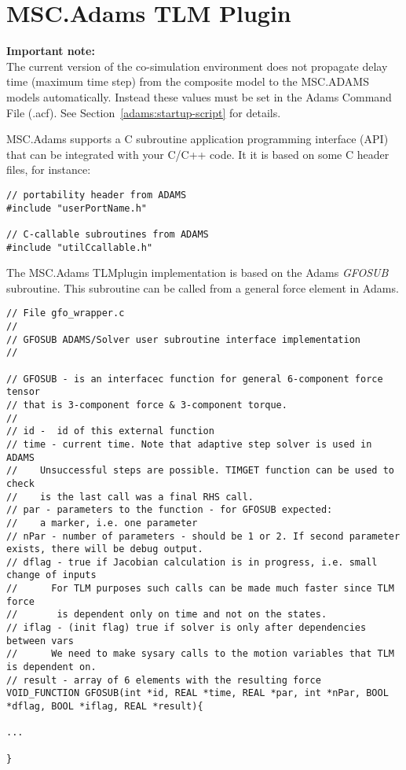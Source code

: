 \chapter{MSC.Adams TLM Plugin}

{\bf Important note:}\\ The current version of the co-simulation environment does not propagate delay time (maximum time step) from the composite model to the MSC.ADAMS models automatically. 
Instead these values must be set in the Adams Command File (.acf). 
See Section~\ref{adams:startup-script} for details.


MSC.Adams supports a C subroutine application programming interface (API) that can be integrated with your C/C++ code. 
It it is based on some C header files, for instance:

{
\scriptsize
\begin{verbatim}
// portability header from ADAMS
#include "userPortName.h"

// C-callable subroutines from ADAMS
#include "utilCcallable.h"
\end{verbatim}
}


The MSC.Adams TLMplugin implementation is based on the Adams {\em GFOSUB} subroutine. 
This subroutine can be called from a general force element in Adams.

{
\scriptsize
\begin{verbatim}
// File gfo_wrapper.c
//
// GFOSUB ADAMS/Solver user subroutine interface implementation
//

// GFOSUB - is an interfacec function for general 6-component force tensor
// that is 3-component force & 3-component torque.
//
// id -  id of this external function
// time - current time. Note that adaptive step solver is used in ADAMS
//    Unsuccessful steps are possible. TIMGET function can be used to check
//    is the last call was a final RHS call.
// par - parameters to the function - for GFOSUB expected:
//    a marker, i.e. one parameter
// nPar - number of parameters - should be 1 or 2. If second parameter exists, there will be debug output.
// dflag - true if Jacobian calculation is in progress, i.e. small change of inputs
//      For TLM purposes such calls can be made much faster since TLM force
//       is dependent only on time and not on the states.
// iflag - (init flag) true if solver is only after dependencies between vars
//      We need to make sysary calls to the motion variables that TLM is dependent on.
// result - array of 6 elements with the resulting force
VOID_FUNCTION GFOSUB(int *id, REAL *time, REAL *par, int *nPar, BOOL *dflag, BOOL *iflag, REAL *result){

...

}
\end{verbatim}
}

